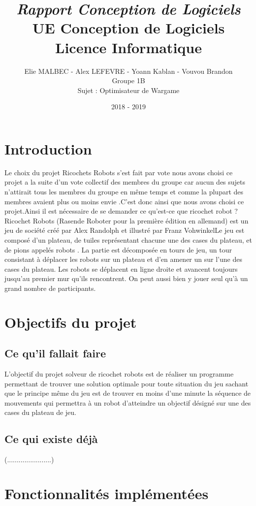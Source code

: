 \documentclass[a4paper]{article} %
\title{
\LARGE{\em{Rapport Conception de Logiciels}}\\\vspace*{0.5cm}
UE Conception de Logiciels\\
Licence Informatique
}
\author{
Elie MALBEC - Alex LEFEVRE -  Yoann Kablan - Vouvou Brandon\\
Groupe 1B\\
Sujet : Optimisateur de Wargame
}
\date{2018 - 2019}
\begin{document}
\newpage
\newpage
	\null %
\newpage

\tableofcontents
\newpage

\section{Introduction}
Le choix du projet Ricochets Robots s'est fait par vote nous avons choisi ce projet a la suite d'un vote collectif des membres du groupe car aucun des sujets n'attirait tous les membres du groupe en même temps et comme la plupart des membres avaient plus ou moins envie .C'est donc ainsi que nous avons choisi ce projet.Ainsi il est nécessaire de se demander ce qu'est-ce que ricochet robot ? Ricochet Robots (Rasende Roboter pour la première édition en allemand) est un jeu de société créé par Alex Randolph et illustré par Franz VohwinkelLe jeu est composé d'un plateau, de tuiles représentant chacune une des cases du plateau, et de pions appelés  robots . La partie est décomposée en tours de jeu, un tour consistant à déplacer les robots sur un plateau et d'en amener un sur l'une des cases du plateau. Les robots se déplacent en ligne droite et avancent toujours jusqu'au premier mur qu'ils rencontrent. On peut aussi bien y jouer seul qu'à un grand nombre de participants.

\section{Objectifs du projet}	
	\subsection{Ce qu’il fallait faire}
L'objectif du projet  solveur de ricochet robots  est de réaliser un programme permettant de trouver une solution optimale pour toute situation du jeu sachant que le principe même du jeu est de trouver en moins d'une minute la séquence de mouvements qui permettra à un robot d'atteindre un objectif désigné sur une des cases du plateau de jeu.
	\subsection{Ce qui existe déjà}
(.......................)

\section{Fonctionnalités implémentées}
\end{document}
